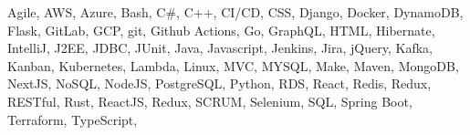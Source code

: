 \vspace\SpacerAboveTopic

\item {
{Agile},
{AWS},
{Azure},
{Bash},
{C\#},
{C++},
{CI/CD},
{CSS},
{Django},
{Docker},
{DynamoDB},
{Flask},
{GitLab},
{GCP},
{git},
{Github Actions},
{Go},
{GraphQL},
{HTML},
{Hibernate},
{IntelliJ},
{J2EE},
{JDBC},
{JUnit},
{Java},
{Javascript},
{Jenkins},
{Jira},
{jQuery},
{Kafka},
{Kanban},
{Kubernetes},
{Lambda},
{Linux},
{MVC},
{MYSQL},
{Make},
{Maven},
{MongoDB},
{NextJS},
{NoSQL},
{NodeJS},
{PostgreSQL},
{Python},
{RDS},
{React},
{Redis},
{Redux},
{RESTful},
{Rust},
{ReactJS},
{Redux},
{SCRUM},
{Selenium},
{SQL},
{Spring Boot},
{Terraform},
{TypeScript},
}

\vspace\SpacerBelowTopic